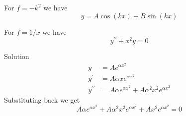 \documentclass[12pt]{article}%
\begin{document}
For $f=-k^{2}$ we have%
\begin{equation}
y=A\cos\left(  kx\right)  +B\sin\left(  kx\right)
\end{equation}


For $f=1/x$ we have%
\begin{equation}
y^{\prime\prime}+x^{2}y=0
\end{equation}


Solution%
\begin{align}
y  &  =Ae^{\alpha x^{2}}\\
y^{\prime}  &  =A\alpha xe^{\alpha x^{2}}\\
y^{\prime\prime}  &  =A\alpha e^{\alpha x^{2}}+A\alpha^{2}x^{2}e^{\alpha
x^{2}}%
\end{align}
Substituting back we get%
\begin{equation}
A\alpha e^{\alpha x^{2}}+A\alpha^{2}x^{2}e^{\alpha x^{2}}+Ax^{2}e^{\alpha
x^{2}}=0
\end{equation}




\end{document}
